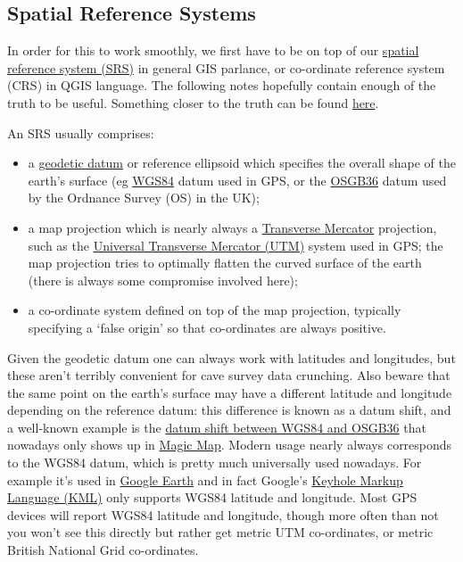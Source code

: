 \documentclass[]{article}
\begin{document}
\subsection{Spatial Reference Systems}\label{spatial-reference-systems}

In order for this to work smoothly, we first have to be on top of our
\href{https://en.wikipedia.org/wiki/Spatial_reference_system}{spatial
reference system (SRS)} in general GIS parlance, or co-ordinate
reference system (CRS) in QGIS language. The following notes hopefully
contain enough of the truth to be useful. Something closer to the truth
can be found
\href{http://www.bnhs.co.uk/focuson/grabagridref/html/OSGB.pdf}{here}.

An SRS usually comprises:

\begin{itemize}
\item
  a \href{https://en.wikipedia.org/wiki/Geodetic_datum}{geodetic datum}
  or reference ellipsoid which specifies the overall shape of the
  earth's surface (eg
  \href{https://en.wikipedia.org/wiki/World_Geodetic_System}{WGS84}
  datum used in GPS, or the
  \href{https://en.wikipedia.org/wiki/Ordnance_Survey_National_Grid}{OSGB36}
  datum used by the Ordnance Survey (OS) in the UK);
\item
  a map projection which is nearly always a
  \href{https://en.wikipedia.org/wiki/Transverse_Mercator_projection}{Transverse
  Mercator} projection, such as the
  \href{https://en.wikipedia.org/wiki/Universal_Transverse_Mercator_coordinate_system}{Universal
  Transverse Mercator (UTM)} system used in GPS; the map projection
  tries to optimally flatten the curved surface of the earth (there is
  always some compromise involved here);
\item
  a co-ordinate system defined on top of the map projection, typically
  specifying a `false origin' so that co-ordinates are always positive.
\end{itemize}

Given the geodetic datum one can always work with latitudes and
longitudes, but these aren't terribly convenient for cave survey data
crunching. Also beware that the same point on the earth's surface may
have a different latitude and longitude depending on the reference
datum: this difference is known as a datum shift, and a well-known
example is the
\href{https://en.wikipedia.org/wiki/Ordnance_Survey_National_Grid\#Datum_shift_between_OSGB_36_and_WGS_84}{datum
shift between WGS84 and OSGB36} that nowadays only shows up in
\href{http://www.natureonthemap.naturalengland.org.uk/MagicMap.aspx}{Magic
Map}. Modern usage nearly always corresponds to the WGS84 datum, which
is pretty much universally used nowadays. For example it's used in
\href{https://en.wikipedia.org/wiki/Google_Earth}{Google Earth} and in
fact Google's \href{https://developers.google.com/kml/}{Keyhole Markup
Language (KML)} only supports WGS84 latitude and longitude. Most GPS
devices will report WGS84 latitude and longitude, though more often than
not you won't see this directly but rather get metric UTM co-ordinates,
or metric British National Grid co-ordinates.
\end{document}
